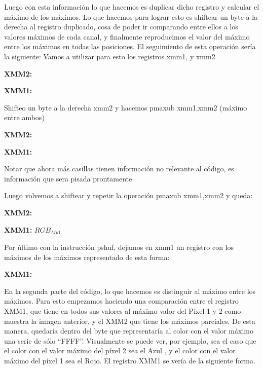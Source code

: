 \par{Luego con esta información lo que hacemos es duplicar dicho registro y calcular el máximo de los máximos. Lo que hacemos para lograr esto es shiftear un byte a la derecha al registro duplicado, cosa de poder ir comparando entre ellos a los valores máximos de cada canal, y finalmente reproducimos el valor del máximo entre los máximos en todas las posiciones. El seguimiento de esta operación sería la siguiente:}
Vamos a utilizar para esto los registros xmm1, y xmm2
\\
\par{\textbf{XMM2:}}
\par{\textbf{XMM1:}}

\clearpage
\par{Shifteo un byte a la derecha xmm2 y hacemos pmaxub xmm1,xmm2 (máximo entre ambos)}
\par{\textbf{XMM2:}}

\par{\textbf{XMM1:}}
\par {Notar que ahora más casillas tienen información no relevante al código, es información que sera pisada prontamente}
\par{Luego volvemos a shiftear y repetir la operación pmaxub xmm1,xmm2  y queda: }

\par{\textbf{XMM2:}}

\par{\textbf{XMM1:}}
{{\scriptsize $RGB_{Mp1}$}}
\par{Por último con la instrucción pshuf, dejamos en xmm1 un registro con los máximos de los máximos representado de esta forma: }
\par{\textbf{XMM1:}}

\par{En la segunda parte del código, lo que hacemos es distinguir al máximo entre los máximos. Para esto empezamos haciendo una comparación entre el registro XMM1, que tiene en todos sus valores al máximo valor del Píxel 1 y 2 como muestra la imagen anterior, y el XMM2 que tiene los máximos parciales. De esta manera, quedaría dentro del byte que representaría al color con el valor máximo una serie de sólo ``FFFF''. Visualmente se puede ver, por ejemplo, sea el caso que el color con el valor máximo del píxel 2 sea el Azul , y el color con el valor máximo del píxel 1 sea el Rojo. El registro XMM1 se vería de la siguiente forma.}
	 
